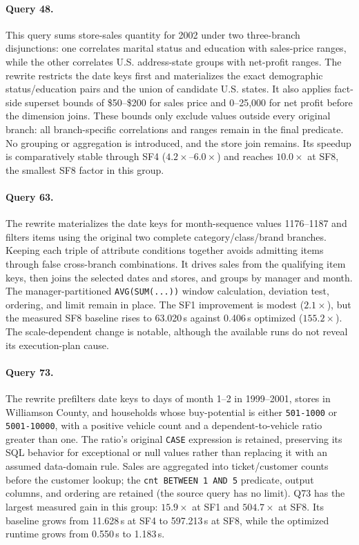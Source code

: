 \documentclass{ULBreport}
\begin{document}
\paragraph{Query 48.} This query sums store-sales quantity for 2002 under two three-branch disjunctions: one correlates marital status and education with sales-price ranges, while the other correlates U.S. address-state groups with net-profit ranges. The rewrite restricts the date keys first and materializes the exact demographic status/education pairs and the union of candidate U.S. states. It also applies fact-side superset bounds of \$50--\$200 for sales price and 0--25{,}000 for net profit before the dimension joins. These bounds only exclude values outside every original branch: all branch-specific correlations and ranges remain in the final predicate. No grouping or aggregation is introduced, and the store join remains. Its speedup is comparatively stable through SF4 ($4.2\times$--$6.0\times$) and reaches $10.0\times$ at SF8, the smallest SF8 factor in this group.

\paragraph{Query 63.} The rewrite materializes the date keys for month-sequence values 1176--1187 and filters items using the original two complete category/class/brand branches. Keeping each triple of attribute conditions together avoids admitting items through false cross-branch combinations. It drives sales from the qualifying item keys, then joins the selected dates and stores, and groups by manager and month. The manager-partitioned \texttt{AVG(SUM(...))} window calculation, deviation test, ordering, and limit remain in place. The SF1 improvement is modest ($2.1\times$), but the measured SF8 baseline rises to 63.020\,s against 0.406\,s optimized ($155.2\times$). The scale-dependent change is notable, although the available runs do not reveal its execution-plan cause.

\paragraph{Query 73.} The rewrite prefilters date keys to days of month 1--2 in 1999--2001, stores in Williamson County, and households whose buy-potential is either \texttt{501-1000} or \texttt{5001-10000}, with a positive vehicle count and a dependent-to-vehicle ratio greater than one. The ratio's original \texttt{CASE} expression is retained, preserving its SQL behavior for exceptional or null values rather than replacing it with an assumed data-domain rule. Sales are aggregated into ticket/customer counts before the customer lookup; the \texttt{cnt BETWEEN 1 AND 5} predicate, output columns, and ordering are retained (the source query has no limit). Q73 has the largest measured gain in this group: $15.9\times$ at SF1 and $504.7\times$ at SF8. Its baseline grows from 11.628\,s at SF4 to 597.213\,s at SF8, while the optimized runtime grows from 0.550\,s to 1.183\,s.
\end{document}
